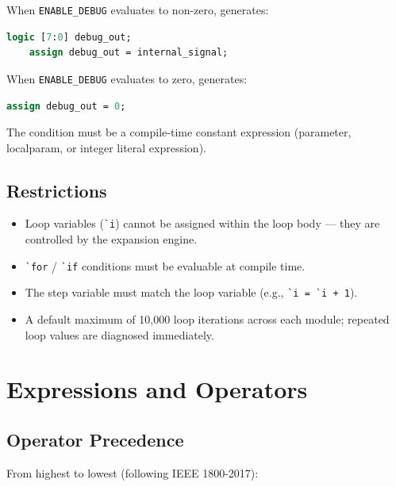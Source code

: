\documentclass[lang=en,11pt]{elegantbook}
\newcommand{\code}[1]{\texttt{#1}}
\newcommand{\slipinline}[1]{\lstinline[language=Slip]|#1|}
\begin{document}
When \code{ENABLE\_DEBUG} evaluates to non-zero, generates:

\begin{lstlisting}[language=SystemVerilog]
    logic [7:0] debug_out;
    assign debug_out = internal_signal;
\end{lstlisting}

When \code{ENABLE\_DEBUG} evaluates to zero, generates:

\begin{lstlisting}[language=SystemVerilog]
assign debug_out = 0;
\end{lstlisting}

The condition must be a compile-time constant expression (parameter, localparam, or integer literal expression).

\section{Restrictions}

\begin{itemize}
  \item Loop variables (\slipinline{`i}) cannot be assigned within the loop body --- they are controlled by the expansion engine.
  \item \slipinline{`for} / \slipinline{`if} conditions must be evaluable at compile time.
  \item The step variable must match the loop variable (e.g., \slipinline{`i = `i + 1}).
  \item A default maximum of 10,000 loop iterations across each module; repeated loop values are diagnosed immediately.
\end{itemize}

\chapter{Expressions and Operators}

\section{Operator Precedence}

From highest to lowest (following IEEE 1800-2017):
\end{document}
